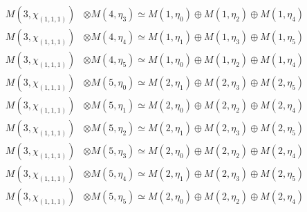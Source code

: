 \begin{align*}
M(3,\chi_{(1,1,1)}) &\otimes M(4,\eta_{3}) \simeq M(1,\eta_{0}) \oplus M(1,\eta_{2}) \oplus M(1,\eta_{4}) \\
M(3,\chi_{(1,1,1)}) &\otimes M(4,\eta_{4}) \simeq M(1,\eta_{1}) \oplus M(1,\eta_{3}) \oplus M(1,\eta_{5}) \\
M(3,\chi_{(1,1,1)}) &\otimes M(4,\eta_{5}) \simeq M(1,\eta_{0}) \oplus M(1,\eta_{2}) \oplus M(1,\eta_{4}) \\
M(3,\chi_{(1,1,1)}) &\otimes M(5,\eta_{0}) \simeq M(2,\eta_{1}) \oplus M(2,\eta_{3}) \oplus M(2,\eta_{5}) \\
M(3,\chi_{(1,1,1)}) &\otimes M(5,\eta_{1}) \simeq M(2,\eta_{0}) \oplus M(2,\eta_{2}) \oplus M(2,\eta_{4}) \\
M(3,\chi_{(1,1,1)}) &\otimes M(5,\eta_{2}) \simeq M(2,\eta_{1}) \oplus M(2,\eta_{3}) \oplus M(2,\eta_{5}) \\
M(3,\chi_{(1,1,1)}) &\otimes M(5,\eta_{3}) \simeq M(2,\eta_{0}) \oplus M(2,\eta_{2}) \oplus M(2,\eta_{4}) \\
M(3,\chi_{(1,1,1)}) &\otimes M(5,\eta_{4}) \simeq M(2,\eta_{1}) \oplus M(2,\eta_{3}) \oplus M(2,\eta_{5}) \\
M(3,\chi_{(1,1,1)}) &\otimes M(5,\eta_{5}) \simeq M(2,\eta_{0}) \oplus M(2,\eta_{2}) \oplus M(2,\eta_{4}) \\
\end{align*}

